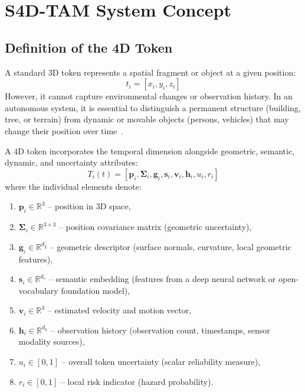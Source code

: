 \section{S4D-TAM System Concept}
\label{sec:system_concept}

\subsection{Definition of the 4D Token}
\label{subsec:token_definition}

A standard 3D token represents a spatial fragment or object at a given position:
\begin{equation}
  t_i = [x_i, y_i, z_i]
\end{equation}
However, it cannot capture environmental changes or observation history. In an autonomous system, it is essential to distinguish a permanent structure (building, tree, or terrain) from dynamic or movable objects (persons, vehicles) that may change their position over time~\cite{pomianek2026s4dtam}.

A 4D token incorporates the temporal dimension alongside geometric, semantic, dynamic, and uncertainty attributes:
\begin{equation}
  T_i(t) = [\mathbf{p}_i, \mathbf{\Sigma}_i, \mathbf{g}_i, \mathbf{s}_i, \mathbf{v}_i, \mathbf{h}_i, u_i, r_i]
\end{equation}
where the individual elements denote:
\begin{enumerate}
  \item $\mathbf{p}_i \in \mathbb{R}^3$ -- position in 3D space,
  \item $\mathbf{\Sigma}_i \in \mathbb{R}^{3 \times 3}$ -- position covariance matrix (geometric uncertainty),
  \item $\mathbf{g}_i \in \mathbb{R}^{d_g}$ -- geometric descriptor (surface normals, curvature, local geometric features),
  \item $\mathbf{s}_i \in \mathbb{R}^{d_s}$ -- semantic embedding (features from a deep neural network or open-vocabulary foundation model),
  \item $\mathbf{v}_i \in \mathbb{R}^3$ -- estimated velocity and motion vector,
  \item $\mathbf{h}_i \in \mathbb{R}^{d_h}$ -- observation history (observation count, timestamps, sensor modality sources),
  \item $u_i \in [0, 1]$ -- overall token uncertainty (scalar reliability measure),
  \item $r_i \in [0, 1]$ -- local risk indicator (hazard probability).
\end{enumerate}

